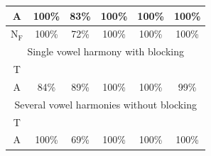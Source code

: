 \documentclass[11pt]{article}
\newcommand{\cmark}{\ding{51}}%
\newcommand{\xmark}{\ding{55}}%
\begin{document}
\begin{table}[t!]
{\begin{tabular}{|cccccc|}
\multicolumn{1}{|c|}{A}                  & \multicolumn{1}{c|}{\cellcolor[HTML]{548235}100\%} & \multicolumn{1}{c|}{\cellcolor[HTML]{F8CBAD}83\%}  & \multicolumn{1}{c|}{\cellcolor[HTML]{548235}100\%} & \multicolumn{1}{c|}{\cellcolor[HTML]{548235}100\%} & \cellcolor[HTML]{548235}100\% \\ \hline
\multicolumn{1}{|c|}{N$_\text{F}$}                  & \multicolumn{1}{c|}{\cellcolor[HTML]{548235}100\%} & \multicolumn{1}{c|}{\cellcolor[HTML]{F8CBAD}72\%}  & \multicolumn{1}{c|}{\cellcolor[HTML]{548235}100\%} & \multicolumn{1}{c|}{\cellcolor[HTML]{548235}100\%} & \cellcolor[HTML]{548235}100\% \\ \hline
\multicolumn{6}{|c|}{Single vowel harmony with blocking}                                                                                                                                                                                                                                     \\ \hline
\multicolumn{1}{|c|}{T}                  & \multicolumn{1}{c|}{{\color[HTML]{FE0000} \xmark}} & \multicolumn{1}{c|}{{\color[HTML]{FE0000} \xmark}} & \multicolumn{1}{c|}{{\color[HTML]{548235} \cmark}} & \multicolumn{1}{c|}{{\color[HTML]{548235} \cmark}} & {\color[HTML]{548235} \cmark} \\ \hline
\multicolumn{1}{|c|}{A}                  & \multicolumn{1}{c|}{\cellcolor[HTML]{F8CBAD}84\%}  & \multicolumn{1}{c|}{\cellcolor[HTML]{F8CBAD}89\%}  & \multicolumn{1}{c|}{\cellcolor[HTML]{548235}100\%} & \multicolumn{1}{c|}{\cellcolor[HTML]{548235}100\%} & \cellcolor[HTML]{C6E0B4}99\%  \\ \hline
\multicolumn{6}{|c|}{Several vowel harmonies without blocking}                                                                                                                                                                                                                               \\ \hline
\multicolumn{1}{|c|}{T}                  & \multicolumn{1}{c|}{{\color[HTML]{548235} \cmark}} & \multicolumn{1}{c|}{{\color[HTML]{FE0000} \xmark}} & \multicolumn{1}{c|}{{\color[HTML]{548235} \cmark}} & \multicolumn{1}{c|}{{\color[HTML]{548235} \cmark}} & {\color[HTML]{548235} \cmark} \\ \hline
\multicolumn{1}{|c|}{A}                  & \multicolumn{1}{c|}{\cellcolor[HTML]{548235}100\%} & \multicolumn{1}{c|}{\cellcolor[HTML]{F8CBAD}69\%}  & \multicolumn{1}{c|}{\cellcolor[HTML]{548235}100\%} & \multicolumn{1}{c|}{\cellcolor[HTML]{548235}100\%} & \cellcolor[HTML]{548235}100\% \\ \hline

\end{tabular}}
\end{table}
\end{document}
